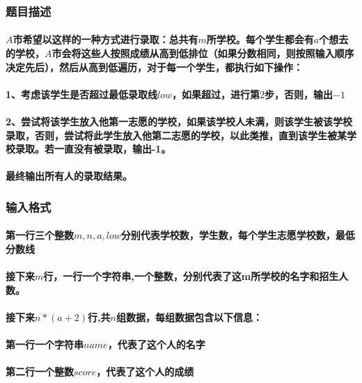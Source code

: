 \documentclass[final,11pt,oneside,UTF8]{report}
\begin{document}
\subsubsection{题目描述}
\paragraph{
    $A$市希望以这样的一种方式进行录取：总共有$m$所学校。每个学生都会有$a$个想去的学校，$A$市会将这些人按照成绩从高到低排位（如果分数相同，则按照输入顺序决定先后），然后从高到低遍历，对于每一个学生，都执行如下操作：
}
\paragraph{
    1、考虑该学生是否超过最低录取线$low$，如果超过，进行第$2$步，否则，输出$-1$
}
\paragraph{
    2、尝试将该学生放入他第一志愿的学校，如果该学校人未满，则该学生被该学校录取，否则，尝试将此学生放入他第二志愿的学校，以此类推，直到该学生被某学校录取。若一直没有被录取，输出-1。
}
\paragraph{
    最终输出所有人的录取结果。
}
\subsubsection{输入格式}
\paragraph{
    第一行三个整数$m,n,a,low$分别代表学校数，学生数，每个学生志愿学校数，最低分数线
}
\paragraph{
    接下来$m$行，一行一个字符串,一个整数，分别代表了这m所学校的名字和招生人数。
}
\paragraph{
    接下来$n*(a+2)$行,共$n$组数据，每组数据包含以下信息：
}
\paragraph{
    第一行一个字符串$name$，代表了这个人的名字
}
\paragraph{
    第二行一个整数$score$，代表了这个人的成绩
}
\end{document}
